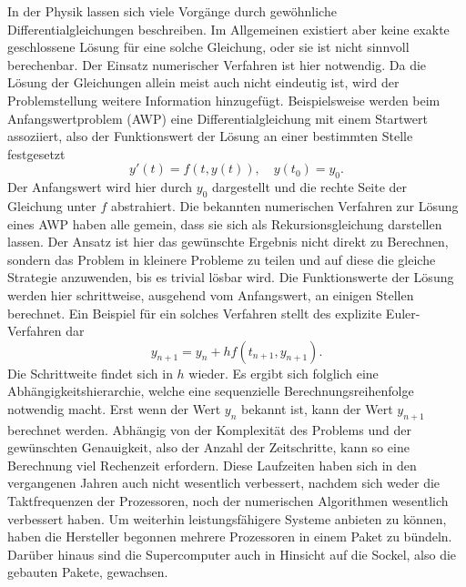 In der Physik lassen sich viele Vorgänge durch gewöhnliche Differentialgleichungen beschreiben. Im Allgemeinen existiert aber keine exakte geschlossene Lösung für eine solche Gleichung, oder sie ist nicht sinnvoll berechenbar. Der Einsatz numerischer Verfahren ist hier notwendig. Da die Lösung der Gleichungen allein meist auch nicht eindeutig ist, wird der Problemstellung weitere Information hinzugefügt. Beispielsweise werden beim Anfangswertproblem (AWP) eine Differentialgleichung mit einem Startwert assoziiert, also der Funktionswert der Lösung an einer bestimmten Stelle festgesetzt
\begin{displaymath}
    y'(t) = f(t,y(t)), \quad y(t_0) = y_0.
\end{displaymath}
Der Anfangswert wird hier durch \(y_0\) dargestellt und die rechte Seite der Gleichung unter \(f\) abstrahiert. Die bekannten numerischen Verfahren zur Lösung eines AWP haben alle gemein, dass sie sich als Rekursionsgleichung darstellen lassen. Der Ansatz ist hier das gewünschte Ergebnis nicht direkt zu Berechnen, sondern das Problem in kleinere Probleme zu teilen und auf diese die gleiche Strategie anzuwenden, bis es trivial lösbar wird. Die Funktionswerte der Lösung werden hier schrittweise, ausgehend vom Anfangswert, an einigen Stellen berechnet. Ein Beispiel für ein solches Verfahren stellt des explizite Euler-Verfahren dar
\begin{displaymath}
    y_{n+1} = y_n + hf(t_{n+1},y_{n+1}).
\end{displaymath}
Die Schrittweite findet sich in \(h\) wieder. Es ergibt sich folglich eine Abhängig\-keits\-hierarchie, welche eine sequenzielle Berechnungsreihenfolge notwendig macht. Erst wenn der Wert \(y_n\) bekannt ist, kann der Wert \(y_{n+1}\) berechnet werden. Abhängig von der Komplexität des Problems und der gewünschten Genauigkeit, also der Anzahl der Zeitschritte, kann so eine Berechnung viel Rechenzeit erfordern. Diese Laufzeiten haben sich in den vergangenen Jahren auch nicht wesentlich verbessert, nachdem sich weder die Taktfrequenzen der Prozessoren, noch der numerischen Algorithmen wesentlich verbessert haben. Um weiterhin leistungsfähigere Systeme anbieten zu können, haben die Hersteller begonnen mehrere Prozessoren in einem Paket zu bündeln. Darüber hinaus sind die Supercomputer auch in Hinsicht auf die Sockel, also die gebauten Pakete, gewachsen.\\

